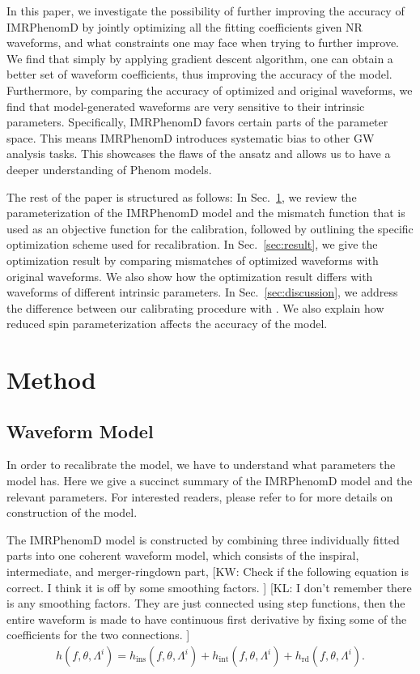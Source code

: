 \documentclass[twocolumn]{aastex631}
\newcommand{\kw}[1]{{\color{rb4}[KW: #1 ]}}
\newcommand{\kl}[1]{{\color{cyan}[KL: #1 ]}}
\begin{document}
In this paper, we investigate the possibility of further improving the accuracy
of IMRPhenomD by jointly optimizing all the fitting coefficients given NR
waveforms, and what constraints one may face when trying to further improve. We
find that simply by applying gradient descent algorithm, one can obtain a better
set of waveform coefficients, thus improving the accuracy of the model.
Furthermore, by comparing the accuracy of optimized and original waveforms, we
find that model-generated waveforms are very sensitive to their intrinsic
parameters. Specifically, IMRPhenomD favors certain parts of the parameter
space. This means IMRPhenomD introduces systematic bias to other GW analysis
tasks. This showcases the flaws of the ansatz and allows us to have a deeper
understanding of Phenom models.  

The rest of the paper is structured as follows: In Sec.~\ref{sec:method}, we
review the parameterization of the IMRPhenomD model and the mismatch function
that is used as an objective function for the calibration, followed by outlining the
specific optimization scheme used for recalibration. In
Sec.~\ref{sec:result}, we give the optimization result by comparing mismatches
of optimized waveforms with original waveforms. We also show how the
optimization result differs with waveforms of different intrinsic parameters. In
Sec.~\ref{sec:discussion}, we address the difference between our calibrating
procedure with \citep{khan2016frequency}. We also explain how reduced spin
parameterization affects the accuracy of the model. 

\section{Method} \label{sec:method}

\subsection{Waveform Model} \label{subsec:waveform_model}

In order to recalibrate the model, we have to understand what parameters the model has.
Here we give a succinct summary of the IMRPhenomD model and the relevant parameters.
For interested readers, please refer to \citep{khan2016frequency} for more details on construction of the model.

The IMRPhenomD model is constructed by combining three individually fitted parts
into one coherent waveform model, which consists of the inspiral, intermediate, and merger-ringdown part, 
\kw{Check if the following equation is correct. I think it is off by some smoothing factors.} 
\kl{I don't remember there is any smoothing factors. They are just connected using step functions, then the entire waveform is made to have continuous first derivative by fixing some of the coefficients for the two connections.}
\begin{align}\label{eq:joint_waveform}
	h(f,\theta,\Lambda^i)=h_{\mathrm{ins}}(f,\theta,\Lambda^i) + h_{\mathrm{int}}(f,\theta,\Lambda^i) + h_{\mathrm{rd}}(f,\theta,\Lambda^i).
\end{align}
\end{document}
